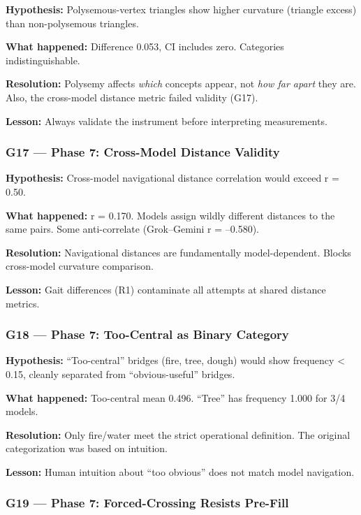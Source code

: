 \textbf{Hypothesis:} Polysemous-vertex triangles show higher curvature (triangle excess) than non-polysemous triangles.

\textbf{What happened:} Difference 0.053, CI includes zero. Categories indistinguishable.

\textbf{Resolution:} Polysemy affects \emph{which} concepts appear, not \emph{how far apart} they are. Also, the cross-model distance metric failed validity (G17).

\textbf{Lesson:} Always validate the instrument before interpreting measurements.

\subsubsection{G17 --- Phase 7: Cross-Model Distance Validity}\label{g17-phase-7-cross-model-distance-validity}

\textbf{Hypothesis:} Cross-model navigational distance correlation would exceed r = 0.50.

\textbf{What happened:} r = 0.170. Models assign wildly different distances to the same pairs. Some anti-correlate (Grok--Gemini r = --0.580).

\textbf{Resolution:} Navigational distances are fundamentally model-dependent. Blocks cross-model curvature comparison.

\textbf{Lesson:} Gait differences (R1) contaminate all attempts at shared distance metrics.

\subsubsection{G18 --- Phase 7: Too-Central as Binary Category}\label{g18-phase-7-too-central-as-binary-category}

\textbf{Hypothesis:} ``Too-central'' bridges (fire, tree, dough) would show frequency \textless{} 0.15, cleanly separated from ``obvious-useful'' bridges.

\textbf{What happened:} Too-central mean 0.496. ``Tree'' has frequency 1.000 for 3/4 models.

\textbf{Resolution:} Only fire/water meet the strict operational definition. The original categorization was based on intuition.

\textbf{Lesson:} Human intuition about ``too obvious'' does not match model navigation.

\subsubsection{G19 --- Phase 7: Forced-Crossing Resists Pre-Fill}\label{g19-phase-7-forced-crossing-resists-pre-fill}

